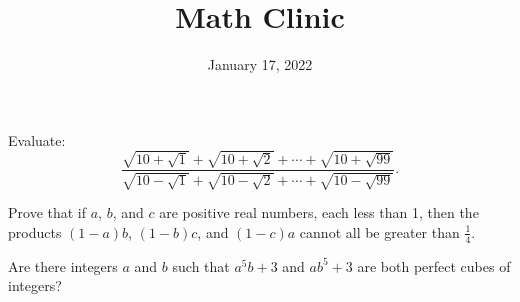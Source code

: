 \documentclass[11pt,twoside]{scrartcl}
\begin{document}
\title{Math Clinic}

\author{}
\date{January 17, 2022}

\maketitle


\begin{problem*}
    Evaluate:
    \[\frac{\sqrt{10+\sqrt{1}} + \sqrt{10+\sqrt{2}} + \cdots + \sqrt{10+\sqrt{99}}}{\sqrt{10-\sqrt{1}} + \sqrt{10-\sqrt{2}} + \cdots + \sqrt{10-\sqrt{99}}}.\]

\end{problem*}

\begin{problem*}
    Prove that if $a$, $b$, and $c$ are positive real numbers, each less than 1, then the products $(1 - a)b$, $(1 - b)c$, and $(1 - c)a$ cannot all be greater than $\frac{1}{4}$.
\end{problem*}

\begin{problem*}
    Are there integers $a$ and $b$ such that $a^5b + 3$ and $ab^5 + 3$ are both perfect cubes of integers?
\end{problem*}



\end{document}

